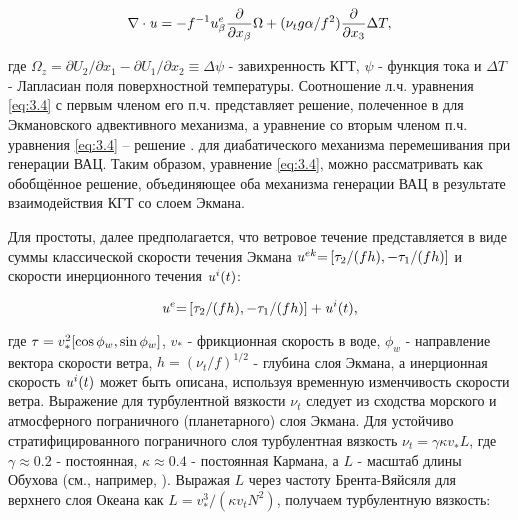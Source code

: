 {\begin{equation} \label{eq:3.4} \nabla \cdot {\it u}=-f^{-1} u_{\beta }^{e} \frac{\partial }{\partial x_{\beta } } \Omega +(\nu _{t} g\alpha /f^{2} )\frac{\partial }{\partial x_{3} } \Delta T,  \end{equation} 



\noindent где $\Omega _{z} =\partial U_{2} /\partial x_{1} -\partial U_{1} /\partial x_{2} \equiv \Delta \psi $ - завихренность КГТ, $\psi $ - функция тока и $\Delta T$ - Лапласиан поля поверхностной температуры. Соотношение л.ч. уравнения \eqref{eq:3.4} с первым членом его п.ч. представляет решение, полеченное в \citep{Klein1990} для Экмановского адвективного механизма, а уравнение со вторым членом п.ч. уравнения \eqref{eq:3.4} -- решение \citep{Garrett1981}. для диабатического механизма перемешивания при генерации ВАЦ. Таким образом, уравнение \eqref{eq:3.4}, можно рассматривать как обобщённое решение, объединяющее оба механизма генерации ВАЦ в результате взаимодействия КГТ со слоем Экмана.

Для простоты, далее предполагается, что ветровое течение представляется в виде суммы классической скорости течения Экмана ${\it u}^{ek} {\it =}\left[\tau _{2} /(fh),-\tau _{1} /(fh)\right]$ и скорости инерционного течения ${\it u}^{i} (t)$:



\begin{equation} \label{eq:3.5} {\it u}^{e} {\it =}\left[\tau _{2} /(fh),-\tau _{1} /(fh)\right]+{\it u}^{i} (t),  \end{equation} 



\noindent где ${\it \tau }=v_{*}^{2} [\cos \phi _{w} ,\sin \phi _{w} ]$, $v_{*} $ - фрикционная скорость в воде, $\phi _{w} $ - направление вектора скорости ветра, $h=(\nu _{t} /f)^{1/2} $ - глубина слоя Экмана, а инерционная скорость ${\it u}^{i} (t)$ может быть описана, используя временную изменчивость скорости ветра. Выражение для турбулентной вязкости $\nu _{t} $ следует из сходства морского и атмосферного пограничного (планетарного) слоя Экмана. Для устойчиво стратифицированного пограничного слоя турбулентная вязкость $\nu _{t} =\gamma \kappa v_{*}^{} L$, где $\gamma \approx 0.2$ - постоянная, $\kappa \approx 0.4$ - постоянная Кармана, а $L$ - масштаб длины Обухова (см., например, \citep{Brown1982}). Выражая $L$ через частоту Брента-Вяйсяля для верхнего слоя Океана как $L=v_{*}^{3} /(\kappa v_{t} N^{2} )$, получаем турбулентную вязкость:



}
